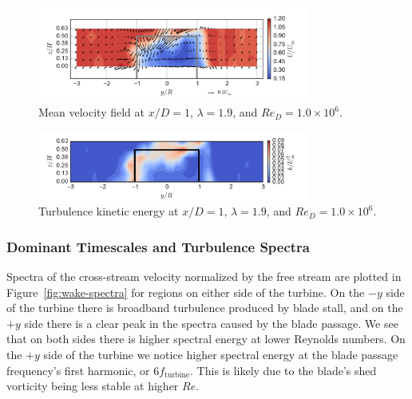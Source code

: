 \documentclass[energies,article,accept,moreauthors,pdftex,12pt,a4paper]{mdpi}
\begin{document}
\begin{figure}[ht!]
\centering
\includegraphics[width=0.8\textwidth]{figures/meancontquiv_10}
\caption{Mean velocity field at $x/D=1$, $\lambda=1.9$, and $Re_D=1.0 \times 10^6$.}
\label{fig:meancontquiv}
\end{figure}

\begin{figure}[ht!]
\centering
\includegraphics[width=0.8\textwidth]{figures/k_contours_10}
\caption{Turbulence kinetic energy at $x/D=1$, $\lambda=1.9$, and
$Re_D=1.0 \times 10^6$.}
\label{fig:kcont}
\end{figure}


\subsubsection{Dominant Timescales and Turbulence Spectra}

Spectra of the cross-stream velocity normalized by the free stream are plotted
in Figure~\ref{fig:wake-spectra} for regions on either side of the turbine. On
the $-y$ side of the turbine there is broadband turbulence produced by blade
stall, and on the $+y$ side there is a clear peak in the spectra caused by the
blade passage. We see that on both sides there is higher spectral energy at
lower Reynolds numbers. On the $+y$ side of the turbine we notice higher
spectral energy at the blade passage frequency's first harmonic, or $6
f_\mathrm{turbine}$. This is likely due to the blade's shed vorticity being less
stable at higher $Re$.
\end{document}
